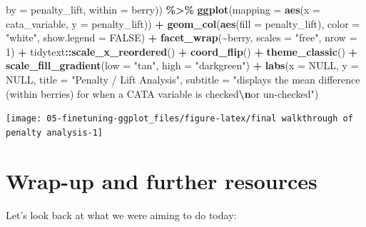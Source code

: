 \documentclass[
]{book}
\newenvironment{Shaded}{\begin{snugshade}}{\end{snugshade}}
\newcommand{\AttributeTok}[1]{\textcolor[rgb]{0.13,0.29,0.53}{#1}}
\newcommand{\ConstantTok}[1]{\textcolor[rgb]{0.56,0.35,0.01}{#1}}
\newcommand{\DecValTok}[1]{\textcolor[rgb]{0.00,0.00,0.81}{#1}}
\newcommand{\FunctionTok}[1]{\textcolor[rgb]{0.13,0.29,0.53}{\textbf{#1}}}
\newcommand{\NormalTok}[1]{#1}
\newcommand{\SpecialCharTok}[1]{\textcolor[rgb]{0.81,0.36,0.00}{\textbf{#1}}}
\newcommand{\StringTok}[1]{\textcolor[rgb]{0.31,0.60,0.02}{#1}}
\begin{document}
\begin{Shaded}
\begin{Highlighting}[]
                                                  \AttributeTok{by =}\NormalTok{ penalty\_lift,}
                                                  \AttributeTok{within =}\NormalTok{ berry)) }\SpecialCharTok{\%\textgreater{}\%}
  \FunctionTok{ggplot}\NormalTok{(}\AttributeTok{mapping =} \FunctionTok{aes}\NormalTok{(}\AttributeTok{x =}\NormalTok{ cata\_variable, }\AttributeTok{y =}\NormalTok{ penalty\_lift)) }\SpecialCharTok{+}
  \FunctionTok{geom\_col}\NormalTok{(}\FunctionTok{aes}\NormalTok{(}\AttributeTok{fill =}\NormalTok{ penalty\_lift), }\AttributeTok{color =} \StringTok{"white"}\NormalTok{, }\AttributeTok{show.legend =} \ConstantTok{FALSE}\NormalTok{) }\SpecialCharTok{+} 
  \FunctionTok{facet\_wrap}\NormalTok{(}\SpecialCharTok{\textasciitilde{}}\NormalTok{berry, }\AttributeTok{scales =} \StringTok{"free"}\NormalTok{, }\AttributeTok{nrow =} \DecValTok{1}\NormalTok{) }\SpecialCharTok{+} 
\NormalTok{  tidytext}\SpecialCharTok{::}\FunctionTok{scale\_x\_reordered}\NormalTok{() }\SpecialCharTok{+} 
  \FunctionTok{coord\_flip}\NormalTok{() }\SpecialCharTok{+} 
  \FunctionTok{theme\_classic}\NormalTok{() }\SpecialCharTok{+} 
  \FunctionTok{scale\_fill\_gradient}\NormalTok{(}\AttributeTok{low =} \StringTok{"tan"}\NormalTok{, }\AttributeTok{high =} \StringTok{"darkgreen"}\NormalTok{) }\SpecialCharTok{+} 
  \FunctionTok{labs}\NormalTok{(}\AttributeTok{x =} \ConstantTok{NULL}\NormalTok{, }\AttributeTok{y =} \ConstantTok{NULL}\NormalTok{,}
       \AttributeTok{title =} \StringTok{"Penalty / Lift Analysis"}\NormalTok{,}
       \AttributeTok{subtitle =} \StringTok{"displays the mean difference (within berries) for when a CATA variable is checked}\SpecialCharTok{\textbackslash{}n}\StringTok{or un{-}checked"}\NormalTok{)}
\end{Highlighting}
\end{Shaded}

\begin{center}\texttt{[image: 05-finetuning-ggplot\_files/figure-latex/final walkthrough of penalty analysis-1]} \end{center}

\hypertarget{wrap-up-and-further-resources}{%
\chapter{Wrap-up and further resources}\label{wrap-up-and-further-resources}}

Let's look back at what we were aiming to do today:
\end{document}
